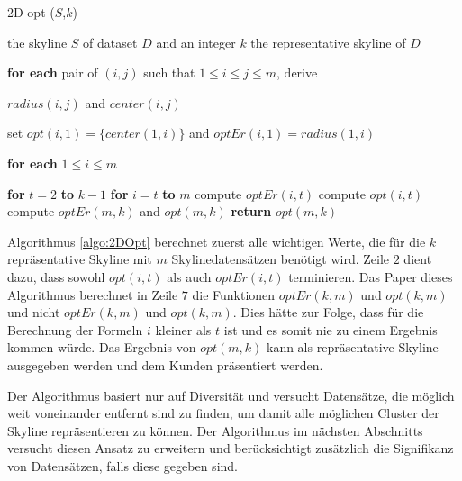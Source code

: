 \begin{algorithm}[H]
\caption{2D-opt ($S$,$k$)}\label{algo:2DOpt}
\begin{algorithmic}[1]
\INPUTBF the skyline $S$ of dataset $D$ and an integer $k$
\OUTPUTBF the representative skyline of $D$
\State \parbox[t]{\dimexpr\linewidth-\algorithmicindent}{\textbf{for each} pair of $(i,j)$ such that $1 \leq i \leq j \leq m$, derive\par 
$radius(i,j)$ and $center(i,j)$\strut}
\State \parbox[t]{\dimexpr\linewidth-\algorithmicindent}{set $opt(i,1) = \{center(1,i)\}$ and $optEr(i,1)=radius(1,i)$\par
\textbf{for each} $1 \leq i \leq m$\strut}
\State \textbf{for} $t=2$ \textbf{to} $k-1$
\State \hspace{\algorithmicindent} \textbf{for} $i=t$ \textbf{to} $m$
\State \hspace{\algorithmicindent}\hspace{\algorithmicindent} compute $optEr(i,t)$
\State \hspace{\algorithmicindent}\hspace{\algorithmicindent} compute $opt(i,t)$
\State compute $optEr(m,k)$ and $opt(m,k)$
\State \textbf{return} $opt(m,k)$
\end{algorithmic}
\end{algorithm}

Algorithmus \ref{algo:2DOpt} berechnet zuerst alle wichtigen Werte, die für die $k$ repräsentative Skyline mit $m$ Skylinedatensätzen benötigt wird. Zeile $2$ dient dazu, dass sowohl $opt(i,t)$ als auch $optEr(i,t)$ terminieren. Das Paper \cite{Tao:2009:DRS:1546683.1547325} dieses Algorithmus berechnet in Zeile $7$ die Funktionen $optEr(k,m)$ und $opt(k,m)$ und nicht $optEr(k,m)$ und $opt(k,m)$. Dies hätte zur Folge, dass für die Berechnung der Formeln $i$ kleiner als $t$ ist und es somit nie zu einem Ergebnis kommen würde.
Das Ergebnis von $opt(m,k)$ kann als repräsentative Skyline ausgegeben werden und dem Kunden präsentiert werden.

Der Algorithmus basiert nur auf Diversität und versucht Datensätze, die möglich weit voneinander entfernt sind zu finden, um damit alle möglichen Cluster der Skyline repräsentieren zu können. Der Algorithmus im nächsten Abschnitts versucht diesen Ansatz zu erweitern und berücksichtigt zusätzlich die Signifikanz von Datensätzen, falls diese gegeben sind.  
